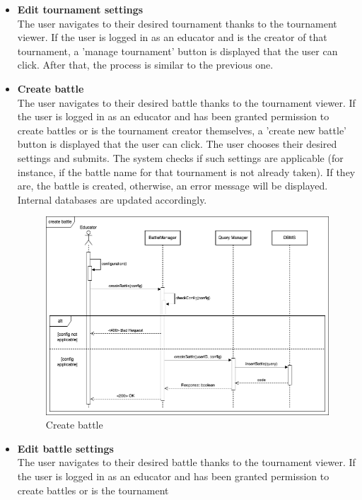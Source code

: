 \begin{itemize}
    \item \textbf{Edit tournament settings}\\
    The user navigates to their desired tournament thanks to the tournament viewer. If the user is logged in as an educator and is the creator of that tournament, a 'manage tournament' 
    button is displayed that the user can click. After that, the process is similar to the previous one.
    \newpage
    \item \textbf{Create battle}\\
    The user navigates to their desired battle thanks to the tournament viewer. If the user is logged in as an educator and has been granted permission to create battles or is the tournament 
    creator themselves, a 'create new battle' button is displayed that the user can click. The user chooses their desired settings and submits. The system checks if such settings are 
    applicable (for instance, if the battle name for that tournament is not already taken). If they are, the battle is created, otherwise, an error message will be displayed. 
    Internal databases are updated accordingly.
    \begin{figure}[h]
        \centering
        \includegraphics[width=1\linewidth]{src/Create battle.png}
        \caption{Create battle}
        \label{fig:Create battle}
    \end{figure}
    \item \textbf{Edit battle settings}\\
    The user navigates to their desired battle thanks to the tournament viewer. If the user is logged in as an educator and has been granted permission to create battles or is the tournament 

\end{itemize}
